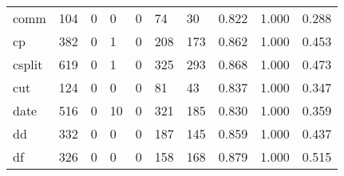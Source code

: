 \begin{longtable}{lp{2.0cm}p{2.0cm}p{2.0cm}p{2.0cm}p{2.0cm}p{2.0cm}p{2.0cm}p{2.0cm}p{2.0cm}}
comm      &                    104 &                                             0 &                                            0 &                                           0 &                                           74 &                                         30 &                                0.822 &                                  1.000 &                                0.288 \\
cp        &                    382 &                                             0 &                                            1 &                                           0 &                                          208 &                                        173 &                                0.862 &                                  1.000 &                                0.453 \\
csplit    &                    619 &                                             0 &                                            1 &                                           0 &                                          325 &                                        293 &                                0.868 &                                  1.000 &                                0.473 \\
cut       &                    124 &                                             0 &                                            0 &                                           0 &                                           81 &                                         43 &                                0.837 &                                  1.000 &                                0.347 \\
date      &                    516 &                                             0 &                                           10 &                                           0 &                                          321 &                                        185 &                                0.830 &                                  1.000 &                                0.359 \\
dd        &                    332 &                                             0 &                                            0 &                                           0 &                                          187 &                                        145 &                                0.859 &                                  1.000 &                                0.437 \\
df        &                    326 &                                             0 &                                            0 &                                           0 &                                          158 &                                        168 &                                0.879 &                                  1.000 &                                0.515 \\

\end{longtable}
